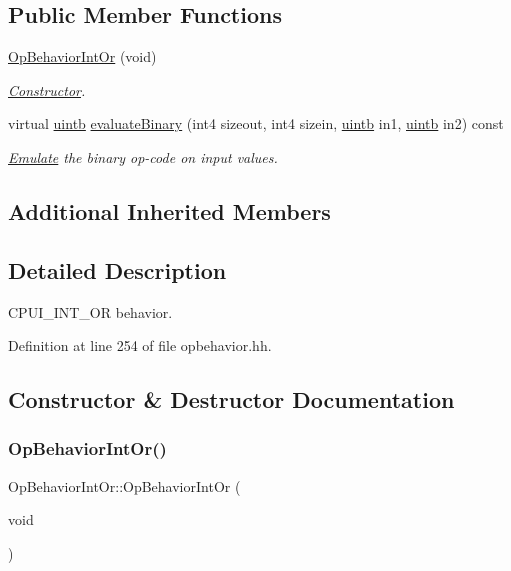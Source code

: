 \subsection*{Public Member Functions}
\begin{DoxyCompactItemize}
\item 
\mbox{\hyperlink{class_op_behavior_int_or_ab04629f0e85deab2e1f9f1b0bcd06f50}{Op\+Behavior\+Int\+Or}} (void)
\begin{DoxyCompactList}\small\item\em \mbox{\hyperlink{class_constructor}{Constructor}}. \end{DoxyCompactList}\item 
virtual \mbox{\hyperlink{types_8h_a2db313c5d32a12b01d26ac9b3bca178f}{uintb}} \mbox{\hyperlink{class_op_behavior_int_or_a314dd3be72ef3dc2aeee21ff9eb2861e}{evaluate\+Binary}} (int4 sizeout, int4 sizein, \mbox{\hyperlink{types_8h_a2db313c5d32a12b01d26ac9b3bca178f}{uintb}} in1, \mbox{\hyperlink{types_8h_a2db313c5d32a12b01d26ac9b3bca178f}{uintb}} in2) const
\begin{DoxyCompactList}\small\item\em \mbox{\hyperlink{class_emulate}{Emulate}} the binary op-\/code on input values. \end{DoxyCompactList}\end{DoxyCompactItemize}
\subsection*{Additional Inherited Members}


\subsection{Detailed Description}
C\+P\+U\+I\+\_\+\+I\+N\+T\+\_\+\+OR behavior. 

Definition at line 254 of file opbehavior.\+hh.



\subsection{Constructor \& Destructor Documentation}
\mbox{\label{class_op_behavior_int_or_ab04629f0e85deab2e1f9f1b0bcd06f50}} 
\subsubsection{\texorpdfstring{OpBehaviorIntOr()}{OpBehaviorIntOr()}}
{\footnotesize\ttfamily Op\+Behavior\+Int\+Or\+::\+Op\+Behavior\+Int\+Or (\begin{DoxyParamCaption}\item[{void}]{ }\end{DoxyParamCaption})\hspace{0.3cm}{\ttfamily [inline]}}



